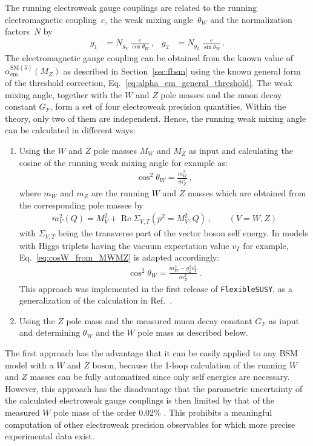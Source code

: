 \documentclass[final,3p,11pt,pdflatex]{elsarticle}
\makeatletter
\newcommand{\fs}{\texttt{FlexibleSUSY}\@\xspace}
\newcommand{\SM}{\ensuremath{\text{SM}}\xspace}
\newcommand{\BSM}{\ensuremath{\text{BSM}}\xspace}
\newcommand{\secref}[1]{Section~\ref{#1}}
\DeclareMathOperator{\re}{Re}
\def\aem{\alpha_{\text{em}}}
\makeatother
\begin{document}
The running electroweak gauge couplings are related to the running
electromagnetic coupling~$e$, the weak mixing angle~$\theta_W$ and the
normalization factors~$N$ by
%
\begin{align}
  g_1 &= N_{g_Y}\,\frac{e}{\cos\theta_W}\,,
  & g_2 &= N_{g_L}\,\frac{e}{\sin\theta_W} \,.
\end{align}
%
The electromagnetic gauge coupling can be obtained from the known
value of $\aem^{\SM(5)}(M_Z)$ as described in
\secref{sec:fbsm} using the known general form of the threshold
correction, Eq.\ \eqref{eq:alpha_em_general_threshold}.
The weak mixing angle, together with the $W$ and $Z$ pole masses and
the muon decay constant $G_F$, form a set of four electroweak
precision quantities. Within the theory, only two of them are
independent. Hence, the running weak
mixing angle can be calculated in different ways:
%
\begin{enumerate}
\item Using the $W$ and $Z$ pole masses $M_W$ and $M_Z$ as input and
  calculating the cosine of the running weak mixing angle for example
  as:
  \begin{align}
    \cos^2\theta_W = \frac{m_W^2}{m_Z^2} \,,
    \label{eq:cosW_from_MWMZ}
  \end{align}
  where $m_W$ and $m_Z$ are the running $W$ and $Z$ masses which are
  obtained from the corresponding pole masses by
  \begin{align}
    m_V^2(Q) = M_V^2 + \re \Sigma_{V,T}(p^2 = M_V^2, Q) \,, \qquad (V=W,Z)
  \end{align}
  with $\Sigma_{V,T}$ being the transverse part of the vector boson
  self energy. In models with Higgs triplets having the
  vacuum expectation value $v_T$ for example,
  Eq.~\eqref{eq:cosW_from_MWMZ} is adapted accordingly:
  \begin{align}
    \cos^2\theta_W = \frac{m_W^2 - g_2^2 v_T^2}{m_Z^2} \,.
  \end{align}
  This approach was implemented in the first release of \fs \cite{Athron:2014yba},
  as a generalization of the calculation in Ref.\ \cite{Athron:2012pw}.
\item Using the $Z$ pole mass and the measured muon decay constant
  $G_F$ as input and determining $\theta_W$ and the $W$ pole mass
  as described below.
\end{enumerate}
%
The first approach has the advantage that it can be easily applied to
any \BSM model with a $W$ and $Z$ boson, because the 1-loop calculation of
the running $W$ and $Z$ masses can be fully automatized since only
self energies are necessary.  However, this approach has the
disadvantage that the parametric uncertainty of the calculated
electroweak gauge couplings is then limited by that
of the measured $W$ pole mass of the order $0.02\%$ \cite{Olive:2016xmw}.
This prohibits a meaningful computation of other electroweak precision
observables for which more precise experimental data exist.
\end{document}
